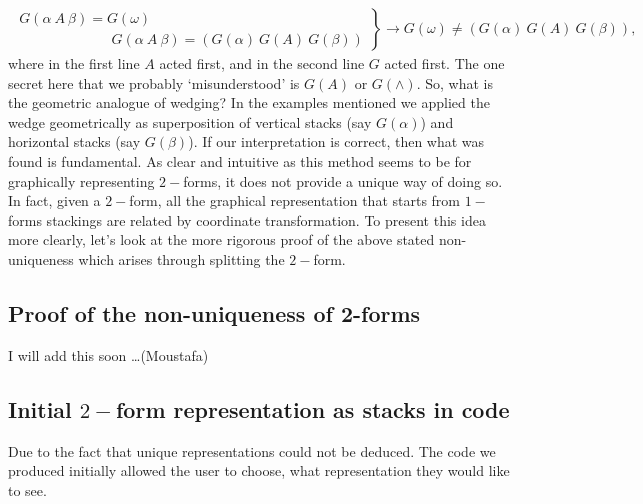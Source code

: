 \documentclass[12pt]{report}
\begin{document}
\begin{eqnarray*}
\left.
\begin{array}{c}
G(\alpha~A~\beta) = G(\omega)\\ 
\,\,\,\,\,\,\,\,\,\,\,\,\,\,\,\,\,\,\,\,\,\,\,\,\,\,\,\,\,\,\,\,\,\,\,\,\,\,\; G(\alpha~A~\beta) = (G(\alpha)~G(A)~G(\beta))
\end{array}
\right \} \to G(\omega) \ne (G(\alpha)~G(A)~G(\beta)),
\end{eqnarray*}
where in the first line $A$ acted first, and in the second line $G$ acted first. The one secret here that we probably `misunderstood' is $G(A)$ or  $G(\wedge)$. So, what is the geometric analogue of wedging? In the examples mentioned we applied the wedge geometrically as superposition of vertical stacks (say $G(\alpha)$) and horizontal stacks (say $G(\beta)$). If our interpretation is correct, then what was found is fundamental. As clear and intuitive as this method seems to be for graphically representing $2-$forms, it does not provide a unique way of doing so. In fact, given a $2-$form, all the graphical representation that starts from $1-$forms stackings are related by coordinate transformation. To present this idea more clearly, let's look at the more rigorous proof of the above stated non-uniqueness which arises through splitting the $2-$form.

\subsection{Proof of the non-uniqueness of 2-forms}

I will add this soon \dots (Moustafa)

\subsection{Initial $2-$form representation as stacks in code}
Due to the fact that unique representations could not be deduced. The code we produced initially allowed the user to choose, what representation they would like to see.\\~\\
\end{document}
